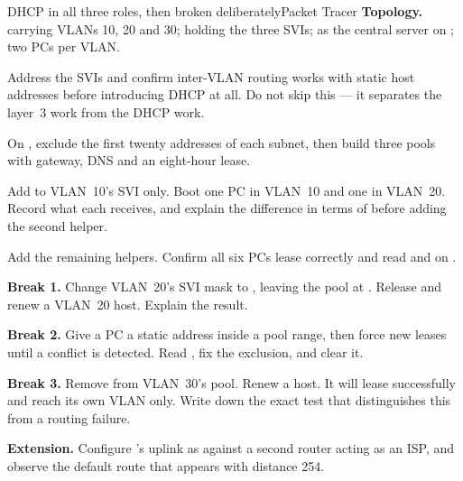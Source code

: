 \begin{lab}{DHCP in all three roles, then broken deliberately}{Packet Tracer}
\textbf{Topology.}  carrying VLANs 10, 20 and 30;  holding the
three SVIs;  as the central server on ; two PCs per VLAN.

\begin{tasks}
  \item Address the SVIs and confirm inter-VLAN routing works with static host
        addresses before introducing DHCP at all. Do not skip this --- it
        separates the layer~3 work from the DHCP work.
  \item On , exclude the first twenty addresses of each subnet, then build
        three pools with gateway, DNS and an eight-hour lease.
  \item Add  to VLAN~10's SVI only. Boot one PC in VLAN~10
        and one in VLAN~20. Record what each receives, and explain the difference
        in terms of  before adding the second helper.
  \item Add the remaining helpers. Confirm all six PCs lease correctly and read
         and  on .
  \item \textbf{Break 1.} Change VLAN~20's SVI mask to , leaving the pool
        at . Release and renew a VLAN~20 host. Explain the result.
  \item \textbf{Break 2.} Give a PC a static address inside a pool range, then
        force new leases until a conflict is detected. Read
        , fix the exclusion, and clear it.
  \item \textbf{Break 3.} Remove  from VLAN~30's pool. Renew a
        host. It will lease successfully and reach its own VLAN only. Write down
        the exact test that distinguishes this from a routing failure.
  \item \textbf{Extension.} Configure 's uplink as 
        against a second router acting as an ISP, and observe the default route
        that appears with distance 254.
\end{tasks}
\end{lab}

